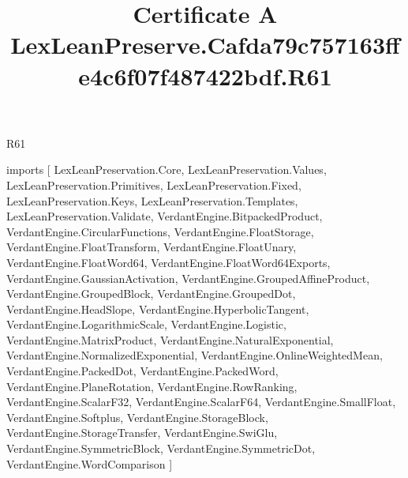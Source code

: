 \begin{lexlean}{R61}
\title{Certificate A LexLeanPreserve.Cafda79c757163ffe4c6f07f487422bdf.R61}
\begin{coremodule}
imports [
  LexLeanPreservation.Core,
  LexLeanPreservation.Values,
  LexLeanPreservation.Primitives,
  LexLeanPreservation.Fixed,
  LexLeanPreservation.Keys,
  LexLeanPreservation.Templates,
  LexLeanPreservation.Validate,
  VerdantEngine.BitpackedProduct,
  VerdantEngine.CircularFunctions,
  VerdantEngine.FloatStorage,
  VerdantEngine.FloatTransform,
  VerdantEngine.FloatUnary,
  VerdantEngine.FloatWord64,
  VerdantEngine.FloatWord64Exports,
  VerdantEngine.GaussianActivation,
  VerdantEngine.GroupedAffineProduct,
  VerdantEngine.GroupedBlock,
  VerdantEngine.GroupedDot,
  VerdantEngine.HeadSlope,
  VerdantEngine.HyperbolicTangent,
  VerdantEngine.LogarithmicScale,
  VerdantEngine.Logistic,
  VerdantEngine.MatrixProduct,
  VerdantEngine.NaturalExponential,
  VerdantEngine.NormalizedExponential,
  VerdantEngine.OnlineWeightedMean,
  VerdantEngine.PackedDot,
  VerdantEngine.PackedWord,
  VerdantEngine.PlaneRotation,
  VerdantEngine.RowRanking,
  VerdantEngine.ScalarF32,
  VerdantEngine.ScalarF64,
  VerdantEngine.SmallFloat,
  VerdantEngine.Softplus,
  VerdantEngine.StorageBlock,
  VerdantEngine.StorageTransfer,
  VerdantEngine.SwiGlu,
  VerdantEngine.SymmetricBlock,
  VerdantEngine.SymmetricDot,
  VerdantEngine.WordComparison
]


\end{coremodule}
\end{lexlean}
